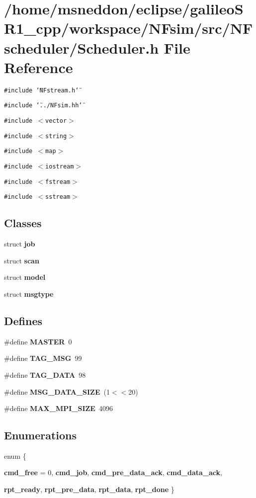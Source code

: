 \section{/home/msneddon/eclipse/galileoSR1\_\-cpp/workspace/NFsim/src/NFscheduler/Scheduler.h File Reference}
\label{Scheduler_8h}


{\tt \#include \char`\"{}NFstream.h\char`\"{}}\par
{\tt \#include \char`\"{}../NFsim.hh\char`\"{}}\par
{\tt \#include $<$vector$>$}\par
{\tt \#include $<$string$>$}\par
{\tt \#include $<$map$>$}\par
{\tt \#include $<$iostream$>$}\par
{\tt \#include $<$fstream$>$}\par
{\tt \#include $<$sstream$>$}\par
\subsection*{Classes}
\begin{CompactItemize}
\item 
struct {\bf job}
\item 
struct {\bf scan}
\item 
struct {\bf model}
\item 
struct {\bf msgtype}
\end{CompactItemize}
\subsection*{Defines}
\begin{CompactItemize}
\item 
\#define {\bf MASTER}~0
\item 
\#define {\bf TAG\_\-MSG}~99
\item 
\#define {\bf TAG\_\-DATA}~98
\item 
\#define {\bf MSG\_\-DATA\_\-SIZE}~(1$<$$<$20)
\item 
\#define {\bf MAX\_\-MPI\_\-SIZE}~4096
\end{CompactItemize}
\subsection*{Enumerations}
\begin{CompactItemize}
\item 
enum \{ \par
{\bf cmd\_\-free} = 0, 
{\bf cmd\_\-job}, 
{\bf cmd\_\-pre\_\-data\_\-ack}, 
{\bf cmd\_\-data\_\-ack}, 
\par
{\bf rpt\_\-ready}, 
{\bf rpt\_\-pre\_\-data}, 
{\bf rpt\_\-data}, 
{\bf rpt\_\-done}
 \}
\end{CompactItemize}
